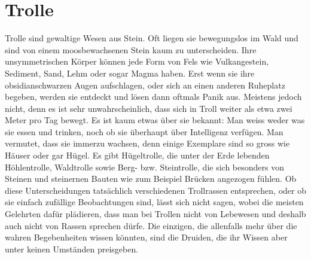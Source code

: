 \documentclass[10pt,twoside,twocolumn,openany]{book}
\begin{document}
\newpage \section{Trolle} 
\begin{multicols}{2}
Trolle sind gewaltige Wesen aus Stein. Oft liegen sie bewegungslos im Wald und sind von einem moosbewachsenen Stein kaum zu unterscheiden. Ihre unsymmetrischen Körper können jede Form von Fels wie Vulkangestein, Sediment, Sand, Lehm oder sogar Magma haben. Erst wenn sie ihre obsidianschwarzen Augen aufschlagen, oder sich an einen anderen Ruheplatz begeben, werden sie entdeckt und lösen dann oftmals Panik aus. Meistens jedoch nicht, denn es ist sehr unwahrscheinlich, dass sich in Troll weiter als etwa zwei Meter pro Tag bewegt. Es ist kaum etwas über sie bekannt: Man weiss weder was sie essen und trinken, noch ob sie überhaupt über Intelligenz verfügen. Man vermutet, dass  sie immerzu wachsen, denn einige Exemplare sind so gross wie Häuser oder gar Hügel. Es gibt Hügeltrolle, die unter der Erde lebenden Höhlentrolle, Waldtrolle sowie Berg- bzw. Steintrolle, die sich besonders von Steinen und steinernen Bauten wie zum Beispiel Brücken angezogen fühlen.
	Ob diese Unterscheidungen tatsächlich verschiedenen Trollrassen entsprechen, oder ob sie einfach zufällige Beobachtungen sind, lässt sich nicht sagen, wobei die meisten Gelehrten dafür plädieren, dass man bei Trollen nicht von Lebewesen und deshalb auch nicht von Rassen sprechen dürfe.
	Die einzigen, die allenfalls mehr über die wahren Begebenheiten wissen könnten, sind die Druiden, die ihr Wissen aber unter keinen Umständen preisgeben.

\end{multicols}

%
\end{document}
